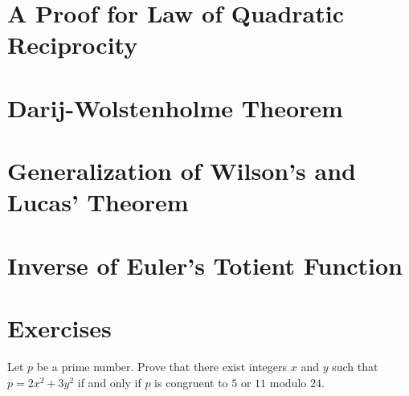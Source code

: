 \documentclass{subfile}
\begin{document}
	\section{A Proof for Law of Quadratic Reciprocity}\label{sec:qrlawproof}
	

	\section{Darij-Wolstenholme Theorem}
	

	\section{Generalization of Wilson's and Lucas' Theorem}\label{sec:wilsongeneral}
	

	\section{Inverse of Euler's Totient Function}
	

	\newpage
	\section{Exercises}
	\begin{problem} %
		Let $p$ be a prime number. Prove that there exist integers $x$ and $y$ such that $p=2x^2+3y^2$ if and only if $p$ is congruent to $5$ or $11$ modulo $24$.
	\end{problem}

\end{document}
